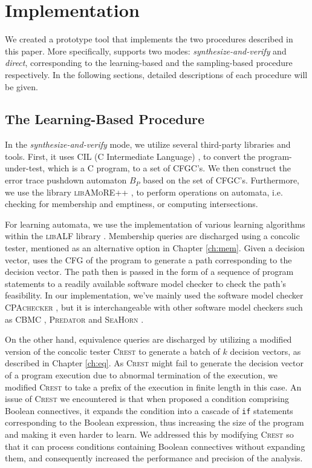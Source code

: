\chapter{Implementation}\label{ch:implementation}

We created a prototype tool \PACMAN that implements the two procedures described in this paper. More specifically, \PACMAN supports two modes: \emph{synthesize-and-verify} and \emph{direct}, corresponding to the learning-based and the sampling-based procedure respectively. In the following sections, detailed descriptions of each procedure will be given.

\section{The Learning-Based Procedure}\label{sec:impl_learning}

In the \emph{synthesize-and-verify} mode, we utilize several third-party libraries and tools. First, it uses CIL (C Intermediate Language) \cite{NeculaMRW02}, \cite{cil} to convert the program-under-test, which is a C program, to a set of CFGC's. We then construct the error trace pushdown automaton $B_P$ based on the set of CFGC's. Furthermore, we use the library \textsc{libAMoRE++} \cite{MatzMPTV95}, \cite{BolligKKLNP10} to perform operations on automata, i.e. checking for membership and emptiness, or computing intersections. 

For learning automata, we use the implementation of various learning algorithms within the \textsc{libALF} library \cite{BolligKKLNP10}. Membership queries are discharged using a concolic tester, mentioned as an alternative option in Chapter \ref{ch:mem}. Given a decision vector, \PACMAN uses the CFG of the program to generate a path corresponding to the decision vector. The path then is passed in the form of a sequence of program statements to a readily available software model checker to check the path's feasibility. In our implementation, we've mainly used the software model checker \textsc{CPAchecker} \cite{BeyerK11}, but it is interchangeable with other software model checkers such as CBMC \cite{ClarkeKL04}, \textsc{Predator} \cite{DudkaPV11} and \textsc{SeaHorn} \cite{GurfinkelKKN15}.

On the other hand, equivalence queries are discharged by utilizing a modified version of the concolic tester \textsc{Crest} \cite{BurnimS08} to generate a batch of $k$ decision vectors, as described in Chapter \ref{ch:eq}. As \textsc{Crest} might fail to generate the decision vector of a program execution due to abnormal termination of the execution, we modified \textsc{Crest} to take a prefix of the execution in finite length in this case. An issue of \textsc{Crest} we encountered is that when proposed a condition comprising Boolean connectives, it expands the condition into a cascade of \texttt{if} statements corresponding to the Boolean expression, thus increasing the size of the program and making it even harder to learn. We addressed this by modifying \textsc{Crest} so that it can process conditions containing Boolean connectives without expanding them, and consequently increased the performance and precision of the analysis. 

